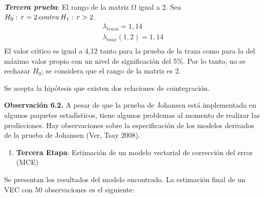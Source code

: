 \textbf{\textit{Tercera prueba}}: El rango de la matriz $\mathrm{\Omega }$ 
igual a 2. Sea $H_{0}:\thinspace r=2\thinspace contra\thinspace 
H_{1}:\thinspace r>2$.
\[
\begin{array}{l}
 \lambda_{traza}=1,14 \\ 
 \lambda_{max}\left( 1,2 \right)=1,14 \\ 
 \end{array}
\]
El valor cr\'{\i}tico es igual a 4,12 tanto para la prueba de la traza como 
para la del m\'{a}ximo valor propio con un nivel de significaci\'{o}n del 
5{\%}. Por lo tanto, no se rechazar $H_{0}$; se considera que el rango de la 
matriz es 2. 

Se acepta la hip\'{o}tesis que existen dos relaciones de cointegraci\'{o}n.

\textbf{Observaci\'{o}n 6.2. }A pesar de que la prueba de Johansen est\'{a} 
implementada en algunos paquetes estad\'{\i}sticos, tiene algunos problemas 
al momento de realizar las predicciones. Hay observaciones sobre la 
especificaci\'{o}n de los modelos derivados de la prueba de Johansen (Ver, 
Tsay 2008).

\begin{enumerate}
\item \textbf{Tercera Etapa}: Estimaci\'{o}n de un modelo vectorial de correcci\'{o}n del error (MCE)
\end{enumerate}

Se presentan los resultados del modelo encontrado. La estimaci\'{o}n final 
de un VEC con 50 observaciones es el siguiente:

